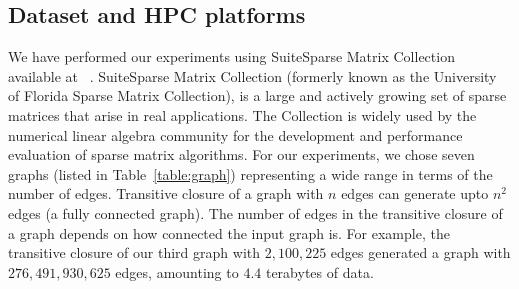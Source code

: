 

\subsection{Dataset and HPC platforms}
\label{sec:datasets}
We have performed our experiments using SuiteSparse Matrix Collection available at ~\cite{}.
SuiteSparse Matrix Collection (formerly known as the University of Florida Sparse Matrix Collection), is a large and actively growing set of sparse matrices that arise in real applications. The Collection is widely used by the numerical linear algebra community for the development and performance evaluation of sparse matrix algorithms. 
For our experiments, we chose seven graphs (listed in Table~\ref{table:graph}) representing a wide range in terms of the number of edges.
Transitive closure of a graph with $n$ edges can generate upto $n^2$ edges (a fully connected graph). The number of edges in the transitive closure of a graph depends on how connected the input graph is. For example, the transitive closure of our third graph with $2,100,225$ edges generated a graph with $276,491,930,625$ edges, amounting to $4.4$ terabytes of data.


